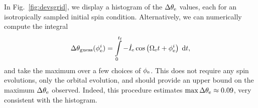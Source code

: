 \documentclass[11pt,
        usenames, %
        dvipsnames %
    ]{article}
\newcommand*{\p}[1]{\left(#1\right)}
\begin{document}
In Fig.~\ref{fig:devsgrid}, we display a histogram of the $\Delta \theta_{\rm
e}$ values, each for an isotropically sampled initial spin condition.
Alternatively, we can numerically compute the integral
\begin{equation}
    \Delta \theta_{\rm guess}(\phi_{\rm e}^i) = \int\limits_0^{t_{\rm f}}
        -\dot{I}_{\rm e} \cos \p{\Omega_{\rm e}t + \phi_{\rm
            e}^i}\;\mathrm{d}t,
\end{equation}
and take the maximum over a few choices of $\phi_{\rm e}$. This does not require
any spin evolutions, only the orbital evolution, and should provide an upper
bound on the maximum $\Delta \theta_{\rm e}$ observed. Indeed, this procedure
estimates $\max \Delta \theta_{\rm e} \approx 0.09$, very consistent with the
histogram.
\end{document}
